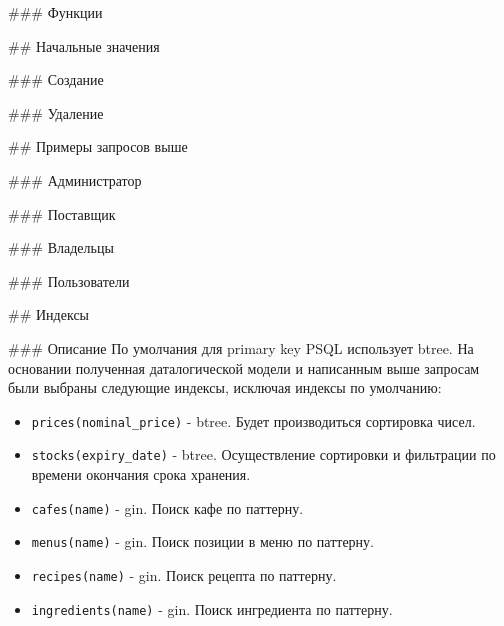 \begin{markdown}
### Функции
\end{markdown}


\begin{markdown}
## Начальные значения

### Создание
\end{markdown}


\begin{markdown}
### Удаление
\end{markdown}


\begin{markdown}
## Примеры запросов выше

### Администратор
\end{markdown}


\begin{markdown}
### Поставщик
\end{markdown}


\begin{markdown}
### Владельцы
\end{markdown}


\begin{markdown}
### Пользователи
\end{markdown}


\begin{markdown}
## Индексы

### Описание
По умолчания для primary key PSQL использует btree. На основании полученная даталогической модели и написанным выше запросам были выбраны следующие индексы, исключая индексы по умолчанию:
\end{markdown}

\begin{itemize}
  \item \Verb"prices(nominal_price)" - btree. Будет производиться сортировка чисел.
  \item \Verb"stocks(expiry_date)" - btree. Осуществление сортировки и фильтрации по времени окончания срока хранения.
  \item \Verb"cafes(name)" - gin. Поиск кафе по паттерну.
  \item \Verb"menus(name)" - gin. Поиск позиции в меню по паттерну.
  \item \Verb"recipes(name)" - gin. Поиск рецепта по паттерну.
  \item \Verb"ingredients(name)" - gin. Поиск ингредиента по паттерну.
\end{itemize}

